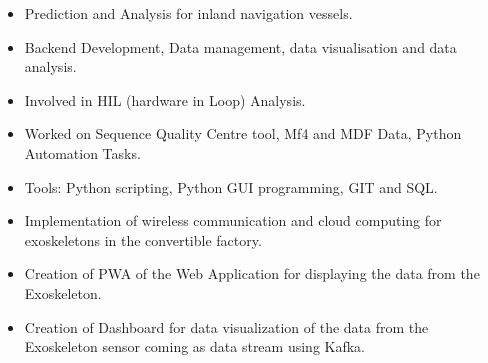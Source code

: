 \documentclass[10pt,a4paper,ragged2e]{altacv}
\begin{document}
\begin{itemize}
\item Prediction and Analysis for inland navigation vessels.
\end{itemize}



\divider


\begin{itemize}
\item Backend Development, Data management, data visualisation and data analysis.
\item Involved in HIL (hardware in Loop) Analysis.
\item Worked on Sequence Quality Centre tool, Mf4 and MDF Data, Python Automation Tasks.
\item Tools: Python scripting, Python GUI programming, GIT and SQL.



\end{itemize}

\divider

\begin{itemize}
\item Implementation of wireless communication and cloud computing for exoskeletons in the convertible factory.
\item Creation of PWA of the Web Application for displaying the data from the Exoskeleton.
\item Creation of Dashboard for data visualization of the data from the Exoskeleton sensor coming as data stream using Kafka.


\end{itemize}

\divider





\end{document}
